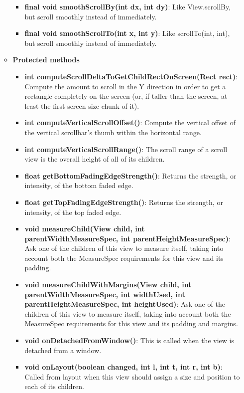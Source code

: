 \documentclass{report}
\begin{document}
\begin{itemize}
\begin{itemize}
\begin{itemize}
                \item \textbf{final void	smoothScrollBy(int dx, int dy)}: Like View.scrollBy, but scroll smoothly instead of immediately.
                \item \textbf{final void	smoothScrollTo(int x, int y)}: Like scrollTo(int, int), but scroll smoothly instead of immediately.
            \end{itemize}
        \item \textbf{Protected methods}
            \begin{itemize}
                \item \textbf{int	computeScrollDeltaToGetChildRectOnScreen(Rect rect)}: Compute the amount to scroll in the Y direction in order to get a rectangle completely on the screen (or, if taller than the screen, at least the first screen size chunk of it).
                \item \textbf{int	computeVerticalScrollOffset()}: Compute the vertical offset of the vertical scrollbar's thumb within the horizontal range.
                \item \textbf{int	computeVerticalScrollRange()}: The scroll range of a scroll view is the overall height of all of its children.
                \item \textbf{float	getBottomFadingEdgeStrength()}: Returns the strength, or intensity, of the bottom faded edge.
                \item \textbf{float	getTopFadingEdgeStrength()}: Returns the strength, or intensity, of the top faded edge.
                \item \textbf{void	measureChild(View child, int parentWidthMeasureSpec, int parentHeightMeasureSpec)}: Ask one of the children of this view to measure itself, taking into account both the MeasureSpec requirements for this view and its padding.
                \item \textbf{void	measureChildWithMargins(View child, int parentWidthMeasureSpec, int widthUsed, int parentHeightMeasureSpec, int heightUsed)}: Ask one of the children of this view to measure itself, taking into account both the MeasureSpec requirements for this view and its padding and margins.
                \item \textbf{void	onDetachedFromWindow()}: This is called when the view is detached from a window.
                \item \textbf{void	onLayout(boolean changed, int l, int t, int r, int b)}: Called from layout when this view should assign a size and position to each of its children.

\end{itemize}
\end{itemize}
\end{itemize}
\end{document}
